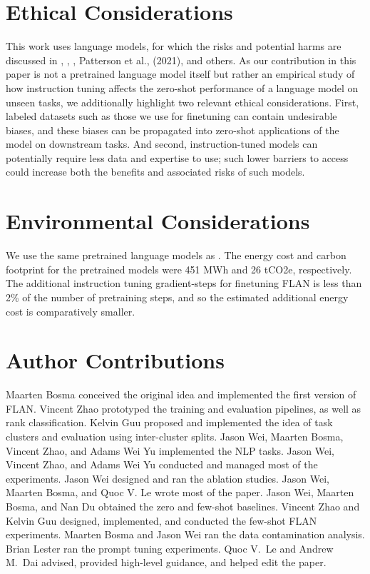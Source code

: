 \documentclass{article} %
\newcommand{\flan}{FLAN}
\begin{document}
\clearpage

\section*{Ethical Considerations}
This work uses language models, for which the risks and potential harms are discussed in \citet{bender-koller-2020-climbing}, \citet{brown2020language}, \citet{10.1145/3442188.3445922}, Patterson et al., (2021), and others. As our contribution in this paper is not a pretrained language model itself but rather an empirical study of how instruction tuning affects the zero-shot performance of a language model on unseen tasks, we additionally highlight two relevant ethical considerations. First, labeled datasets such as those we use for finetuning can contain undesirable biases, and these biases can be propagated into zero-shot applications of the model on downstream tasks.  And second, instruction-tuned models can potentially require less data and expertise to use; such lower barriers to access could increase both the benefits and associated risks of such models.

\section*{Environmental Considerations}
We use the same pretrained language models as \citet{Austin2021ProgramSW}. %
The energy cost and carbon footprint for the pretrained models were 451 MWh and 26 tCO2e, respectively. 
The additional instruction tuning gradient-steps for finetuning \flan{} is less than 2\% of the number of pretraining steps, and so the estimated additional energy cost is comparatively smaller.

\section*{Author Contributions}\label{sec:contributions}
Maarten Bosma conceived the original idea and implemented the first version of \flan. 
Vincent Zhao prototyped the training and evaluation pipelines, as well as rank classification. 
Kelvin Guu proposed and implemented the idea of task clusters and evaluation using inter-cluster splits. 
Jason Wei, Maarten Bosma, Vincent Zhao, and Adams Wei Yu implemented the NLP tasks. 
Jason Wei, Vincent Zhao, and Adams Wei Yu conducted and managed most of the experiments. 
Jason Wei designed and ran the ablation studies. 
Jason Wei, Maarten Bosma, and Quoc V. Le wrote most of the paper. 
Jason Wei, Maarten Bosma, and Nan Du obtained the zero and few-shot baselines. 
Vincent Zhao and Kelvin Guu designed, implemented, and conducted the few-shot FLAN experiments.
Maarten Bosma and Jason Wei ran the data contamination analysis.
Brian Lester ran the prompt tuning experiments. 
Quoc V.~Le and Andrew M.~Dai advised, provided high-level guidance, and helped edit the paper.
\end{document}
